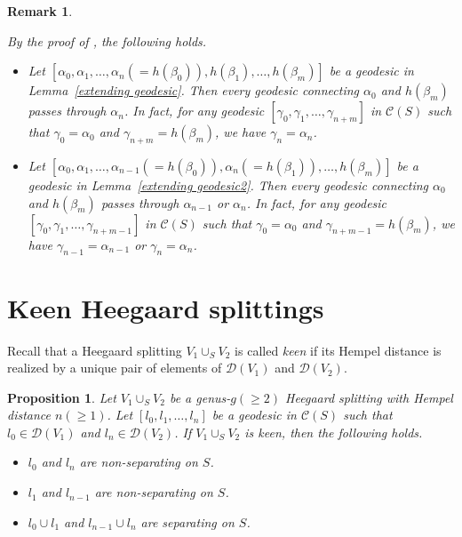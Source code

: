 \documentclass[]{aspm}
\newtheorem{proposition}[definition]{Proposition}
\newtheorem{remark}[definition]{Remark}
\begin{document}
\begin{remark}\label{rmk-geodesic}
{\rm
By the proof of \cite[Propositions 4.1, 4.4]{IJK}, the following holds.
\begin{itemize}
\item 
Let $[\alpha_{0}, \alpha_{1}, \dots, \alpha_{n}(=h(\beta_{0})), h(\beta_{1}), \dots, h(\beta_{m})]$ be a geodesic in Lemma~\ref{extending geodesic}.
Then every geodesic connecting $\alpha_0$ and $h(\beta_{m})$ passes through $\alpha_n$.
In fact, for any geodesic $[\gamma_0, \gamma_1, \dots, \gamma_{n+m}]$ in $\mathcal{C}(S)$ such that $\gamma_0=\alpha_0$ and $\gamma_{n+m}=h(\beta_m)$, we have $\gamma_n=\alpha_n$.
\item 
Let $[\alpha_{0}, \alpha_{1}, \dots, \alpha_{n-1}(=h(\beta_{0})), \alpha_n(=h(\beta_{1})), \dots, h(\beta_{m})]$ be a geodesic in Lemma~\ref{extending geodesic2}.
Then every geodesic connecting $\alpha_0$ and $h(\beta_{m})$ passes through $\alpha_{n-1}$ or $\alpha_n$.
In fact, for any geodesic $[\gamma_0, \gamma_1, \dots, \gamma_{n+m-1}]$ in $\mathcal{C}(S)$ such that $\gamma_0=\alpha_0$ and $\gamma_{n+m-1}=h(\beta_m)$, we have $\gamma_{n-1}=\alpha_{n-1}$ or $\gamma_n=\alpha_n$.
\end{itemize}
}
\end{remark}




\section{Keen Heegaard splittings}\label{sec-keen}


Recall that a Heegaard splitting $V_{1}\cup_S V_{2}$ is called {\it keen} if its Hempel distance is realized by a unique pair of elements of $\mathcal{D}(V_{1})$ and $\mathcal{D}(V_{2})$.


\begin{proposition}\label{prop-keen}
Let $V_1\cup_S V_2$ be a genus-$g(\geq 2)$ Heegaard splitting with Hempel distance $n(\geq 1)$.
Let $[l_0, l_1,\dots,l_n]$ be a geodesic in $\mathcal{C}(S)$ such that $l_0\in\mathcal{D}(V_1)$ and $l_n\in\mathcal{D}(V_2)$.
If $V_1\cup_S V_2$ is keen, then the following holds.
\begin{itemize}
\item[(1)] $l_0$ and $l_n$ are non-separating on $S$.
\item[(2)] $l_1$ and $l_{n-1}$ are non-separating on $S$.
\item[(3)] $l_0\cup l_1$ and $l_{n-1}\cup l_n$ are separating on $S$.
\end{itemize}
\end{proposition}
\end{document}
